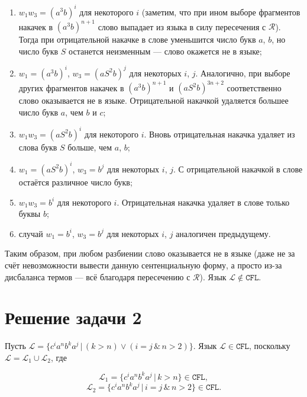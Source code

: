 \documentclass{article}
\begin{document}
\begin{enumerate}
  \item $w_1 w_3 = (a^3 b)^i$ для некоторого $i$ (заметим, что при ином 
    выборе фрагментов накачек в $(a^3 b)^{n+1}$ слово выпадает из языка в силу
    пересечения с $\mathcal{R}$). Тогда при отрицательной накачке в слове
    уменьшится число букв $a$, $b$, но число букв $S$ останется неизменным ---
    слово окажется не в языке;

  \item $w_1 = (a^3 b)^i$, $w_3 = (a S^2 b)^j$ для некоторых $i$, $j$.
    Аналогично, при выборе других фрагментов накачек в $(a^3 b)^{n+1}$ и
    $(a S^2 b)^{3n+2}$ соответственно слово оказывается не в языке.
    Отрицательной накачкой удаляется большее число букв $a$, чем $b$ и $c$;

  \item $w_1 w_3 = (a S^2 b)^{i}$ для некоторого $i$. Вновь отрицательная
    накачка удаляет из слова букв $S$ больше, чем $a$, $b$;

  \item $w_1 = (a S^2 b)^{i}$, $w_3 = b^j$ для некоторых $i$, $j$. С
    отрицательной накачкой в слове остаётся различное число букв;

  \item $w_1 w_3 = b^i$ для некоторого $i$. Отрицательная накачка удаляет в
    слове только буквы $b$;

  \item случай $w_1 = b^i$, $w_3 = b^j$ для некоторых $i$, $j$ аналогичен
    предыдущему.
\end{enumerate}

Таким образом, при любом разбиении слово оказывается не в языке (даже не за
счёт невозможности вывести данную сентенциальную форму, а просто из-за
дисбаланса термов --- всё благодаря пересечению с $\mathcal{R}$). Язык
$\mathcal{L} \notin \mathtt{CFL}$.

\section{Решение задачи 2}

Пусть $\mathcal{L} = \{c^i a^n b^k a^j \, | \, (k > n) \lor (i = j \, \& \,
n > 2)\}$. Язык $\mathcal{L} \in \mathtt{CFL}$, поскольку $\mathcal{L} =
\mathcal{L}_1 \cup \mathcal{L}_2$, где

\[\mathcal{L}_1 = \{c^i a^n b^k a^j \, | \, k > n\} \in \mathtt{CFL},\]
\[\mathcal{L}_2 = \{c^i a^n b^k a^j \, | \, i = j \, \& \, n > 2 \} \in \mathtt{CFL}.\]
\end{document}
